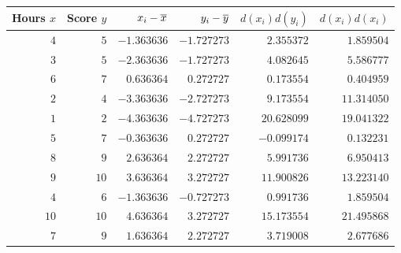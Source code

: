\begin{tabular}{rrrrrr}                                                                  \toprule
Hours $x$ & Score $y$ & $x_i - \overline{x}$ & $y_i - \overline{y}$ & $d(x_i)d(y_i)$ & $d(x_i)d(x_i)$ \\\midrule
$4$       & $5$       & $-1.363636$   & $-1.727273$   & $2.355372$    & $1.859504$     \\[4pt]
$3$       & $5$       & $-2.363636$   & $-1.727273$   & $4.082645$    & $5.586777$     \\[4pt]
$6$       & $7$       & $0.636364$    & $0.272727$    & $0.173554$    & $0.404959$     \\[4pt]
$2$       & $4$       & $-3.363636$   & $-2.727273$   & $9.173554$    & $11.314050$    \\[4pt]
$1$       & $2$       & $-4.363636$   & $-4.727273$   & $20.628099$   & $19.041322$    \\[4pt]
$5$       & $7$       & $-0.363636$   & $0.272727$    & $-0.099174$   & $0.132231$     \\[4pt]
$8$       & $9$       & $2.636364$    & $2.272727$    & $5.991736$    & $6.950413$     \\[4pt]
$9$       & $10$      & $3.636364$    & $3.272727$    & $11.900826$   & $13.223140$    \\[4pt]
$4$       & $6$       & $-1.363636$   & $-0.727273$   & $0.991736$    & $1.859504$     \\[4pt]
$10$      & $10$      & $4.636364$    & $3.272727$    & $15.173554$   & $21.495868$    \\[4pt]
$7$       & $9$       & $1.636364$    & $2.272727$    & $3.719008$    & $2.677686$     \\\bottomrule
\end{tabular}

